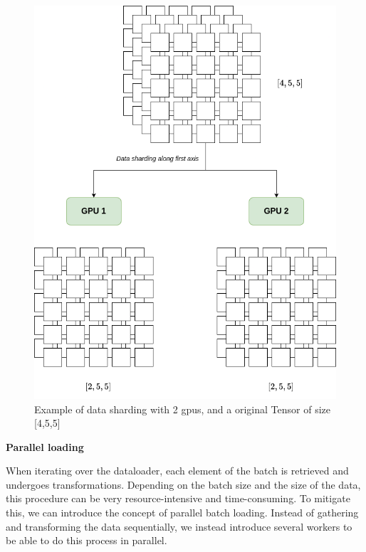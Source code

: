 \begin{figure}[h]
    \centering
    \includegraphics[scale=0.4]{figures/sharding.png}
    \caption{Example of data sharding with 2 gpus, and a original Tensor of size [4,5,5]}
    \label{fig:sharding}
\end{figure}


\textbf{Parallel loading}

When iterating over the dataloader, each element of the batch is retrieved and undergoes transformations. Depending on the batch size and  the size of the data, this procedure can be very resource-intensive and time-consuming. To mitigate this, we can introduce the concept of parallel batch loading. Instead of gathering and transforming the data sequentially, we instead introduce several workers to be able to do this process in parallel. 

\lstset{style=pstyle}
